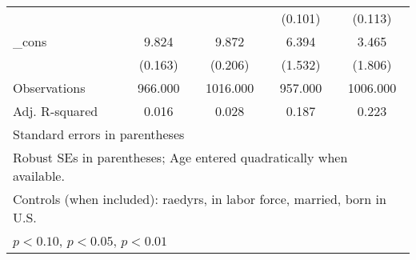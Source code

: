 \begin{table}[htbp]
\begin{tabular}{l*{4}{c}}
          &                  &                  &  (0.101)         &  (0.113)         \\
\_cons    &    9.824\sym{***}&    9.872\sym{***}&    6.394\sym{***}&    3.465\sym{*}  \\
          &  (0.163)         &  (0.206)         &  (1.532)         &  (1.806)         \\
\midrule
Observations&  966.000         & 1016.000         &  957.000         & 1006.000         \\
Adj. R-squared&    0.016         &    0.028         &    0.187         &    0.223         \\
\bottomrule
\multicolumn{5}{l}{\footnotesize Standard errors in parentheses}\\
\multicolumn{5}{l}{\footnotesize Robust SEs in parentheses; Age entered quadratically when available.}\\
\multicolumn{5}{l}{\footnotesize Controls (when included): raedyrs, in labor force, married, born in U.S.}\\
\multicolumn{5}{l}{\footnotesize \sym{*} \(p<0.10\), \sym{**} \(p<0.05\), \sym{***} \(p<0.01\)}\\
\end{tabular}
\end{table}
